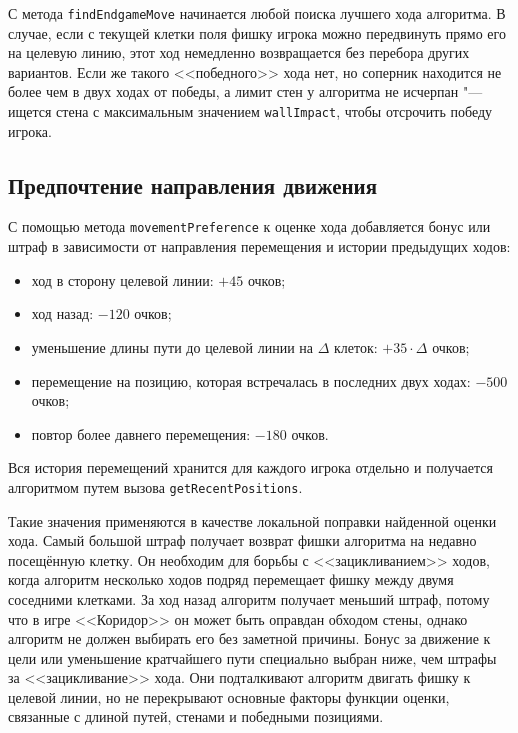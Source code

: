 \documentclass[a4paper,12pt]{diplom}
\begin{document}
С метода \texttt{findEndgameMove} начинается любой поиска лучшего хода алгоритма. В случае, если с текущей клетки поля фишку игрока можно передвинуть прямо его на целевую линию, этот ход немедленно возвращается без перебора других вариантов. Если же такого <<победного>> хода нет, но соперник находится не более чем в двух ходах от победы, а лимит стен у алгоритма не исчерпан "--- ищется стена с максимальным значением \texttt{wallImpact}, чтобы отсрочить победу игрока.

\subsection*{Предпочтение направления движения}

С помощью метода \texttt{movementPreference} к оценке хода добавляется бонус или штраф в зависимости от направления перемещения и истории предыдущих ходов:

\begin{itemize}
    \item ход в сторону целевой линии: $+45$ очков;
    \item ход назад: $-120$ очков;
    \item уменьшение длины пути до целевой линии на $\Delta$ клеток: $+35 \cdot \Delta$ очков;
    \item перемещение на позицию, которая встречалась в последних двух ходах: $-500$ очков;
    \item повтор более давнего перемещения: $-180$ очков.
\end{itemize}

Вся история перемещений хранится для каждого игрока отдельно и получается алгоритмом путем вызова \texttt{getRecentPositions}.

Такие значения применяются в качестве локальной поправки найденной оценки хода. Самый большой штраф получает возврат фишки алгоритма на недавно посещённую клетку. Он необходим для борьбы с <<зацикливанием>> ходов, когда алгоритм несколько ходов подряд перемещает фишку между двумя соседними клетками. За ход назад алгоритм получает меньший штраф, потому что в игре <<Коридор>> он может быть оправдан обходом стены, однако алгоритм не должен выбирать его без заметной причины. Бонус за движение к цели или уменьшение кратчайшего пути специально выбран ниже, чем штрафы за <<зацикливание>> хода. Они подталкивают алгоритм двигать фишку к целевой линии, но не перекрывают основные факторы функции оценки, связанные с длиной путей, стенами и победными позициями.
\end{document}
